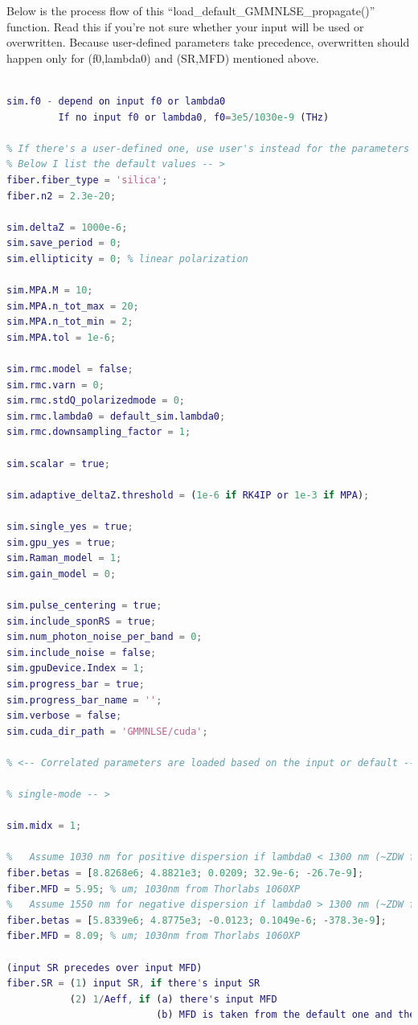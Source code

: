 \documentclass[12pt,hidelinks]{book}
\begin{document}
Below is the process flow of this ``load\_default\_GMMNLSE\_propagate()'' function. Read this if you're not sure whether your input will be used or overwritten. Because user-defined parameters take precedence, overwritten should happen only for (f0,lambda0) and (SR,MFD) mentioned above.
\begin{lstlisting}[language=MATLAB]
% <-- Uncorrelated parameters are loaded directly -->

sim.f0 - depend on input f0 or lambda0
         If no input f0 or lambda0, f0=3e5/1030e-9 (THz)
         
% If there's a user-defined one, use user's instead for the parameters below.
% Below I list the default values -- >
fiber.fiber_type = 'silica';
fiber.n2 = 2.3e-20;

sim.deltaZ = 1000e-6;
sim.save_period = 0;
sim.ellipticity = 0; % linear polarization

sim.MPA.M = 10;
sim.MPA.n_tot_max = 20;
sim.MPA.n_tot_min = 2;
sim.MPA.tol = 1e-6;

sim.rmc.model = false;
sim.rmc.varn = 0;
sim.rmc.stdQ_polarizedmode = 0;
sim.rmc.lambda0 = default_sim.lambda0;
sim.rmc.downsampling_factor = 1;

sim.scalar = true;

sim.adaptive_deltaZ.threshold = (1e-6 if RK4IP or 1e-3 if MPA);

sim.single_yes = true;
sim.gpu_yes = true;
sim.Raman_model = 1;
sim.gain_model = 0;

sim.pulse_centering = true;
sim.include_sponRS = true;
sim.num_photon_noise_per_band = 0;
sim.include_noise = false;
sim.gpuDevice.Index = 1;
sim.progress_bar = true;
sim.progress_bar_name = '';
sim.verbose = false;
sim.cuda_dir_path = 'GMMNLSE/cuda';

% <-- Correlated parameters are loaded based on the input or default -->

% single-mode -- >

sim.midx = 1;

%   Assume 1030 nm for positive dispersion if lambda0 < 1300 nm (~ZDW for a silica fiber),
fiber.betas = [8.8268e6; 4.8821e3; 0.0209; 32.9e-6; -26.7e-9];
fiber.MFD = 5.95; % um; 1030nm from Thorlabs 1060XP
%   Assume 1550 nm for negative dispersion if lambda0 > 1300 nm (~ZDW for a silica fiber),
fiber.betas = [5.8339e6; 4.8775e3; -0.0123; 0.1049e-6; -378.3e-9];
fiber.MFD = 8.09; % um; 1030nm from Thorlabs 1060XP

(input SR precedes over input MFD)
fiber.SR = (1) input SR, if there's input SR
           (2) 1/Aeff, if (a) there's input MFD
                          (b) MFD is taken from the default one and there's no input MFD
                          

\end{lstlisting}
\end{document}
